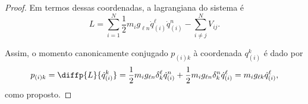 \begin{proof}
    Em termos dessas coordenadas, a lagrangiana do sistema é
    \begin{equation*}
        L = \sum_{i = 1}^{N}\frac12 m_i g_{\ell n}\dot{q}_{(i)}^\ell \dot{q}_{(i)}^n - \sum_{i\neq j}^N V_{ij}.
    \end{equation*}

    Assim, o momento canonicamente conjugado \(p_{(i)k}\) à coordenada \(q_{(i)}^k\) é dado por
    \begin{equation*}
        p_{(i)k} = \diffp{L}{\dot{q}_{(i)}^k} = \frac12 m_i g_{\ell n} \delta^\ell_{k} \dot{q}_{(i)}^n + \frac12 m_i g_{\ell n} \delta^n_k \dot{q}_{(i)}^\ell = m_i g_{\ell k} \dot{q}_{(i)}^\ell,
    \end{equation*}
    como proposto.
\end{proof}

